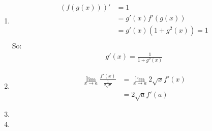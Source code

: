 \documentclass{article}
\begin{document}
\begin{enumerate}
		\item
		\begin{align*}
			(f(g(x)))' &= 1 \\
			&= g'(x)f'(g(x)) \\
			&= g'(x)(1 + g^2(x)) = 1 \\
		\end{align*}
		So:
		\begin{align*}
			g'(x) = \frac{1}{1 + g^2(x)}
		\end{align*}
			
		\item 
		\begin{align*}
			\lim_{x \rightarrow a} \frac{f'(x)}{\frac{1}{2\sqrt{x}}} &= \lim_{x \rightarrow a} 2\sqrt{x}f'(x) \\
			&= 2\sqrt{a}f'(a)
		\end{align*}
	
		\item 
		
		\item 
		
	
					
	\end{enumerate}
\end{document}
